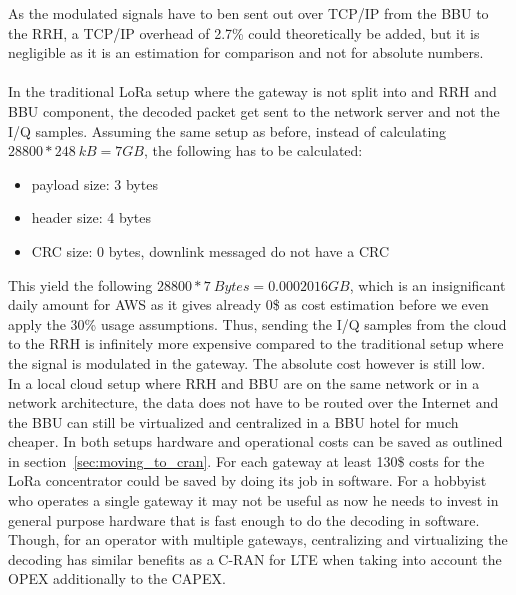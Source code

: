 As the modulated signals have to ben sent out over TCP/IP from the BBU to the RRH, a TCP/IP overhead 
of 2.7\% could theoretically be added, but it is negligible as it is an estimation for 
comparison and not for absolute numbers.
\\
\\
In the traditional LoRa setup where the gateway is not split into and RRH and BBU 
component, the decoded packet get sent to the network server and not the I/Q samples.
Assuming the same setup as before, instead of calculating $28800 * 248~kB = 7 GB$, the following
has to be calculated: 

\begin{itemize}
    \item payload size: 3 bytes
    \item header size: 4 bytes
    \item CRC size: 0 bytes, downlink messaged do not have a CRC
\end{itemize}

This yield the following $28800 * 7~Bytes = 0.0002016 GB$, which is an insignificant daily amount for AWS as
it gives already 0\$ as cost estimation before we even apply the 30\% usage assumptions.
Thus, sending the I/Q samples from the cloud to the RRH is infinitely more expensive compared to the traditional setup 
where the signal is modulated in the gateway. The absolute cost however is still low.
\\
In a local cloud setup where RRH and BBU are on the same network
or in a network architecture, the data does not have to be routed over the Internet and 
the BBU can still be virtualized and centralized in a BBU hotel for much cheaper.
In both setups hardware and operational costs can be saved as outlined in section~\ref{sec:moving_to_cran}.
For each gateway at least 130\$ costs for the LoRa concentrator could be saved by doing its job in software.
For a hobbyist who operates a single gateway it may not be useful as now he needs to invest in general purpose hardware 
that is fast enough to do the decoding in software. Though, for an operator with multiple gateways, centralizing and virtualizing
the decoding has similar benefits as a C-RAN for LTE when taking into account the OPEX additionally to the CAPEX.

